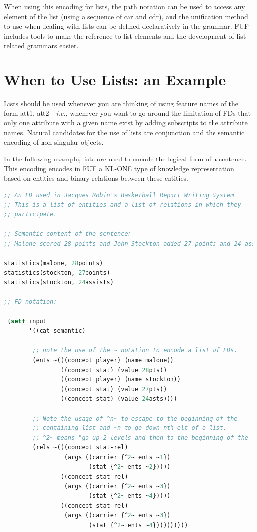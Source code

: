\documentclass[10pt,a4paper]{report}
\begin{document}
When using this encoding for lists, the path notation can be used to access
any element of the list (using a sequence of car and cdr), and the
unification method to use when dealing with lists can be defined
declaratively in the grammar.  FUF includes tools to make the reference to
list elements and the development of list-related grammars easier.

\section{When to Use Lists: an Example}

Lists should be used whenever you are thinking of using feature names of
the form att1, att2 - {\em i.e.}, whenever you want to go around the
limitation of FDs that only one attribute with a given name exist by adding
subscripts to the attribute names.  Natural candidates for the use of lists
are conjunction and the semantic encoding of non-singular objects.  

In the following example, lists are used to encode the logical form of a
sentence.  This encoding encodes in FUF a KL-ONE type of knowledge
representation based on entities and binary relations between these
entities.  

\begin{lstlisting}[language=Lisp]
;; An FD used in Jacques Robin's Basketball Report Writing System
;; This is a list of entities and a list of relations in which they
;; participate. 

;; Semantic content of the sentence:
;; Malone scored 28 points and John Stockton added 27 points and 24 assists.

statistics(malone, 28points)
statistics(stockton, 27points)
statistics(stockton, 24assists)

;; FD notation:

 (setf input
       '((cat semantic)

        ;; note the use of the ~ notation to encode a list of FDs.
		(ents ~(((concept player) (name malone))
				((concept stat) (value 28pts))
				((concept player) (name stockton))
				((concept stat) (value 27pts))
				((concept stat) (value 24asts))))

		;; Note the usage of ^n~ to escape to the beginning of the
		;; containing list and ~n to go down nth elt of a list.
        ;; ^2~ means "go up 2 levels and then to the beginning of the list"
		(rels ~(((concept stat-rel)
				 (args ((carrier {^2~ ents ~1}) 
						(stat {^2~ ents ~2}))))
				((concept stat-rel)
				 (args ((carrier {^2~ ents ~3}) 
						(stat {^2~ ents ~4}))))
				((concept stat-rel)
				 (args ((carrier {^2~ ents ~3}) 
						(stat {^2~ ents ~4})))))))))

\end{lstlisting}
\end{document}
